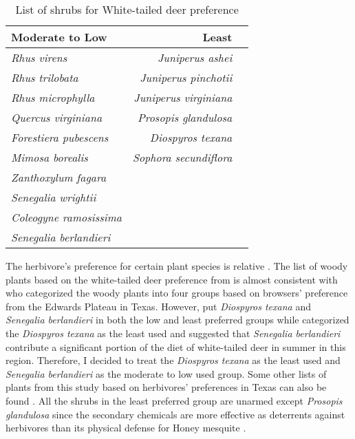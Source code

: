 \documentclass{ttuthes2007}
\begin{document}
\begin{table}
    \centering
    \begin{tabular}{lrr}
     Moderate to Low & Least \\
     \hline
    \emph{Rhus virens} & \emph{Juniperus ashei} \\
    \emph{Rhus trilobata} & \emph{Juniperus pinchotii}\\
    \emph{Rhus microphylla} & \emph{Juniperus virginiana}\\
    \emph{Quercus virginiana} & \emph{Prosopis glandulosa}\\
    \emph{Forestiera pubescens} & \emph{Diospyros texana}\\
    \emph{Mimosa borealis} & \emph{Sophora secundiflora}\\
    \emph{Zanthoxylum fagara} &   \\
    \emph{Senegalia wrightii} & \\
    \emph{Coleogyne ramosissima} & \\
    \emph{Senegalia berlandieri} & \\
    \end{tabular}
    \caption{List of shrubs for White-tailed deer preference \citep*{wright2003white}}
\end{table}

The herbivore’s preference for certain plant species is relative \citep{wright2003white}. The list of woody plants based on the white-tailed deer preference from \citep{wright2003white} is almost consistent with \citep{nelle1996management} who categorized the woody plants into four groups based on browsers’ preference from the Edwards Plateau in Texas. However,  \citep{wright2003white} put \emph{Diospyros texana} and \emph{Senegalia berlandieri} in both the low and least preferred groups while \citep{nelle1996management} categorized the \emph{Diospyros texana} as the least used and \citep*{varner1987southern} suggested that \emph{Senegalia berlandieri} contribute a significant portion of the diet of white-tailed deer in summer in this region.  Therefore, I decided to treat the \emph{Diospyros texana} as the least used and \emph{Senegalia berlandieri} as the moderate to low used group. Some other lists of plants from this study based on herbivores’ preferences in Texas can also be found \citep{arnold1979seasonallist, nelle2001ecological, everitt1974springfoodhabit, dillard2006whitetaileddeer}. %
All the shrubs in the least preferred group are unarmed except \emph{Prosopis glandulosa} since the secondary chemicals are more effective as deterrents against herbivores than its physical defense for Honey mesquite \citep{wright2003white}.
\end{document}
